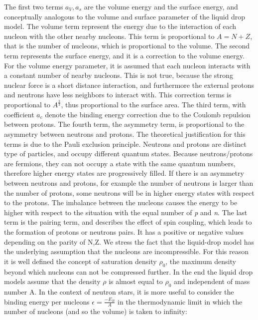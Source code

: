 The first two terms $a_{V},a_{s}$ are the volume energy and the surface energy, and conceptually analogous to the volume and surface parameter of the liquid drop model. The volume term represent the energy due to the interaction of each nucleon with the other nearby nucleons. This term is proportional to $A = N + Z$, that is the number of nucleons, which is proportional to the volume. The second term represents the surface energy, and it is a correction to the volume energy. For the volume energy parameter, it is assumed that each nucleon interacts with a constant number of nearby nucleons. This is not true, because the strong nuclear force is a short distance interaction, and furthermore the external protons and neutrons have less neighbors to interact with. This correction terms is proportional to $A^{\frac{2}{3}}$, thus proportional to the surface area. 
The third term, with coefficient $a_{c}$ denote the binding energy correction due to the Coulomb repulsion between protons. The fourth term, the asymmetry term, is proportional to the asymmetry between neutrons and protons. The theoretical justification for this terms is due to the Pauli exclusion principle. Neutrons and protons are distinct type of particles, and occupy different quantum states. Because neutrons/protons are fermions, they can not occupy a state with the same quantum numbers, therefore higher energy states are progressively filled. If there is an asymmetry between neutrons and protons, for example the number of neutrons is larger than the number of protons, some neutrons will be in higher energy states with respect to the protons. The imbalance between the nucleons causes the energy to be higher with respect to the situation with the equal number of \textit{p} and \textit{n}. 
The last term is the pairing term, and describes the effect of spin coupling, which leads to the formation of protons or neutrons pairs. It has a positive or negative values depending on the parity of N,Z. 
We stress the fact that the liquid-drop model has the underlying assumption that the nucleons are incompressible. For this reason it is well defined the concept of saturation density $\rho_{0}$, the maximum density beyond which nucleons can not be compressed further. In the end the liquid drop models assume that the density $\rho$ is almost equal to $\rho_{0}$ and independent of mass number A. In the context of neutron stars, it is more useful to consider the binding energy per nucleons $\epsilon = \frac{-E_{B}}{A}$ in the thermodynamic limit in which the number of nucleons (and so the volume) is taken to infinity:

